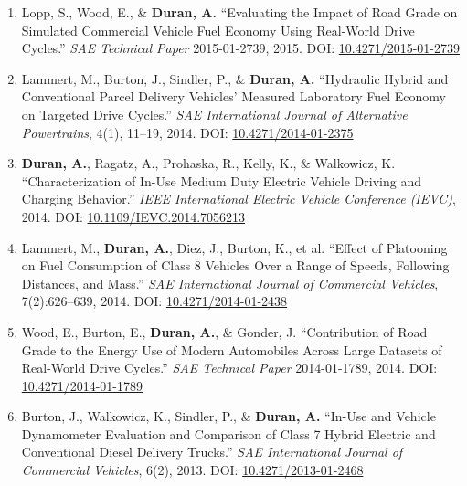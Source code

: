 \documentclass[11pt,letterpaper]{article}
\begin{document}
\begin{enumerate}
  \item Lopp, S., Wood, E., \& \textbf{Duran, A.}
        ``Evaluating the Impact of Road Grade on Simulated Commercial Vehicle Fuel Economy
        Using Real-World Drive Cycles.''
        \textit{SAE Technical Paper} 2015-01-2739, 2015.
        DOI: \href{https://doi.org/10.4271/2015-01-2739}{10.4271/2015-01-2739}

  \item Lammert, M., Burton, J., Sindler, P., \& \textbf{Duran, A.}
        ``Hydraulic Hybrid and Conventional Parcel Delivery Vehicles' Measured Laboratory
        Fuel Economy on Targeted Drive Cycles.''
        \textit{SAE International Journal of Alternative Powertrains}, 4(1), 11--19, 2014.
        DOI: \href{https://doi.org/10.4271/2014-01-2375}{10.4271/2014-01-2375}

  \item \textbf{Duran, A.}, Ragatz, A., Prohaska, R., Kelly, K., \& Walkowicz, K.
        ``Characterization of In-Use Medium Duty Electric Vehicle Driving and Charging
        Behavior.''
        \textit{IEEE International Electric Vehicle Conference (IEVC)}, 2014.
        DOI: \href{https://doi.org/10.1109/IEVC.2014.7056213}{10.1109/IEVC.2014.7056213}

  \item Lammert, M., \textbf{Duran, A.}, Diez, J., Burton, K., et al.
        ``Effect of Platooning on Fuel Consumption of Class 8 Vehicles Over a Range of
        Speeds, Following Distances, and Mass.''
        \textit{SAE International Journal of Commercial Vehicles}, 7(2):626--639, 2014.
        DOI: \href{https://doi.org/10.4271/2014-01-2438}{10.4271/2014-01-2438}

  \item Wood, E., Burton, E., \textbf{Duran, A.}, \& Gonder, J.
        ``Contribution of Road Grade to the Energy Use of Modern Automobiles Across Large
        Datasets of Real-World Drive Cycles.''
        \textit{SAE Technical Paper} 2014-01-1789, 2014.
        DOI: \href{https://doi.org/10.4271/2014-01-1789}{10.4271/2014-01-1789}

  \item Burton, J., Walkowicz, K., Sindler, P., \& \textbf{Duran, A.}
        ``In-Use and Vehicle Dynamometer Evaluation and Comparison of Class 7 Hybrid
        Electric and Conventional Diesel Delivery Trucks.''
        \textit{SAE International Journal of Commercial Vehicles}, 6(2), 2013.
        DOI: \href{https://doi.org/10.4271/2013-01-2468}{10.4271/2013-01-2468}


\end{enumerate}
\end{document}
